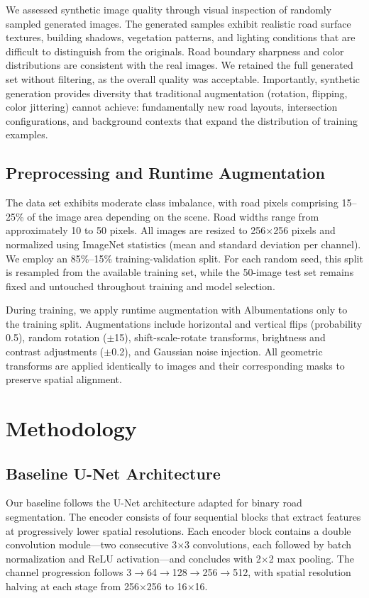 \documentclass[conference]{IEEEtran}
\begin{document}
We assessed synthetic image quality through visual inspection of randomly sampled generated images. The generated samples exhibit realistic road surface textures, building shadows, vegetation patterns, and lighting conditions that are difficult to distinguish from the originals. Road boundary sharpness and color distributions are consistent with the real images. We retained the full generated set without filtering, as the overall quality was acceptable. Importantly, synthetic generation provides diversity that traditional augmentation (rotation, flipping, color jittering) cannot achieve: fundamentally new road layouts, intersection configurations, and background contexts that expand the distribution of training examples.

\subsection{Preprocessing and Runtime Augmentation}

The data set exhibits moderate class imbalance, with road pixels comprising 15--25\% of the image area depending on the scene. Road widths range from approximately 10 to 50 pixels. All images are resized to 256$\times$256 pixels and normalized using ImageNet statistics (mean and standard deviation per channel). We employ an 85\%--15\% training-validation split. For each random seed, this split is resampled from the available training set, while the 50-image test set remains fixed and untouched throughout training and model selection.

During training, we apply runtime augmentation with Albumentations \cite{b16} only to the training split. Augmentations include horizontal and vertical flips (probability 0.5), random rotation ($\pm$15\textdegree), shift-scale-rotate transforms, brightness and contrast adjustments ($\pm$0.2), and Gaussian noise injection. All geometric transforms are applied identically to images and their corresponding masks to preserve spatial alignment.

\section{Methodology}
\label{sec:methodology}

\subsection{Baseline U-Net Architecture}

Our baseline follows the U-Net architecture \cite{b1} adapted for binary road segmentation. The encoder consists of four sequential blocks that extract features at progressively lower spatial resolutions. Each encoder block contains a double convolution module---two consecutive 3$\times$3 convolutions, each followed by batch normalization and ReLU activation---and concludes with 2$\times$2 max pooling. The channel progression follows 3$\rightarrow$64$\rightarrow$128$\rightarrow$256$\rightarrow$512, with spatial resolution halving at each stage from 256$\times$256 to 16$\times$16.
\end{document}
